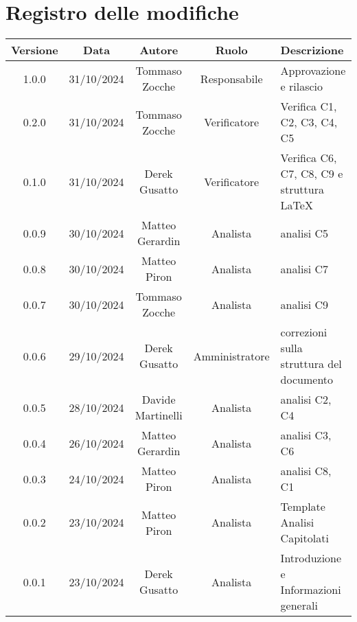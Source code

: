 
\section*{Registro delle modifiche}
\begin{table}[H]
    \begin{tabular}{|c|c|c|c|p{3cm}|}
        \hline
        \textbf{Versione} &  \textbf{Data} &  \textbf{Autore} &  \textbf{Ruolo} & \textbf{Descrizione} \\
        \hline
        1.0.0 & 31/10/2024 & Tommaso Zocche & Responsabile & Approvazione e rilascio\\
        \hline
        0.2.0 & 31/10/2024 & Tommaso Zocche & Verificatore & Verifica C1, C2, C3, C4, C5\\
        \hline
        0.1.0 & 31/10/2024 & Derek Gusatto & Verificatore & Verifica C6, C7, C8, C9 e struttura LaTeX \\
        \hline
        0.0.9 & 30/10/2024 & Matteo Gerardin & Analista & analisi C5 \\
        \hline
        0.0.8 & 30/10/2024 & Matteo Piron & Analista & analisi C7 \\
        \hline
        0.0.7 & 30/10/2024 & Tommaso Zocche & Analista & analisi C9 \\
        \hline
        0.0.6 & 29/10/2024 & Derek Gusatto & Amministratore &  correzioni sulla struttura del documento\\
        \hline
        0.0.5 & 28/10/2024 & Davide Martinelli & Analista & analisi C2, C4 \\
        \hline
        0.0.4 & 26/10/2024 & Matteo Gerardin & Analista & analisi C3, C6 \\
        \hline
        0.0.3 & 24/10/2024 & Matteo Piron & Analista & analisi C8, C1 \\
        \hline
        0.0.2 & 23/10/2024 & Matteo Piron & Analista & Template Analisi Capitolati \\
        \hline
        0.0.1 & 23/10/2024 & Derek Gusatto & Analista & Introduzione e Informazioni generali \\
        \hline
    \end{tabular}
\end{table}